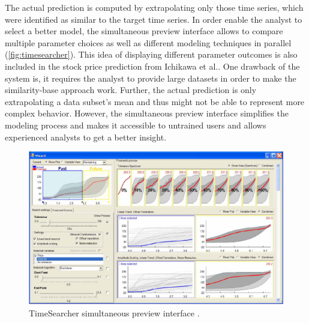 \documentclass[electronic]{vgtc}             %
\begin{document}
The actual prediction is computed by extrapolating only those time series, which were identified as similar to the target time series.
In order enable the analyst to select a better model, the simultaneous preview interface allows to compare multiple parameter choices as well as different modeling techniques in parallel (\autoref{fig:timesearcher}).
This idea of displaying different parameter outcomes is also included in the stock price prediction from Ichikawa et al.\cite{ichikawa:2002}.
One drawback of the system is, it requires the analyst to provide large datasets in order to make the similarity-base approach work.
Further, the actual prediction is only extrapolating a data subset's mean and thus might not be able to represent more complex behavior. 
However, the simultaneous preview interface simplifies the modeling process and makes it accessible to untrained users and allows experienced analysts to get a better insight.

\begin{figure}[htb]
	\centering
	\includegraphics[width=\columnwidth]{TimeSearcher}
	\caption{TimeSearcher simultaneous preview interface \cite{buono:2007}.
	}
	\label{fig:timesearcher}
\end{figure}
\end{document}
